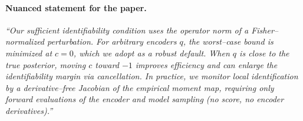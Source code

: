 \paragraph{Nuanced statement for the paper.}
\emph{“Our sufficient identifiability condition uses the operator norm of a Fisher–normalized perturbation. For arbitrary encoders $q$, the worst–case bound is minimized at $c=0$, which we adopt as a robust default. When $q$ is close to the true posterior, moving $c$ toward $-1$ improves efficiency and can enlarge the identifiability margin via cancellation. In practice, we monitor local identification by a derivative–free Jacobian of the empirical moment map, requiring only forward evaluations of the encoder and model sampling (no score, no encoder derivatives).”}

